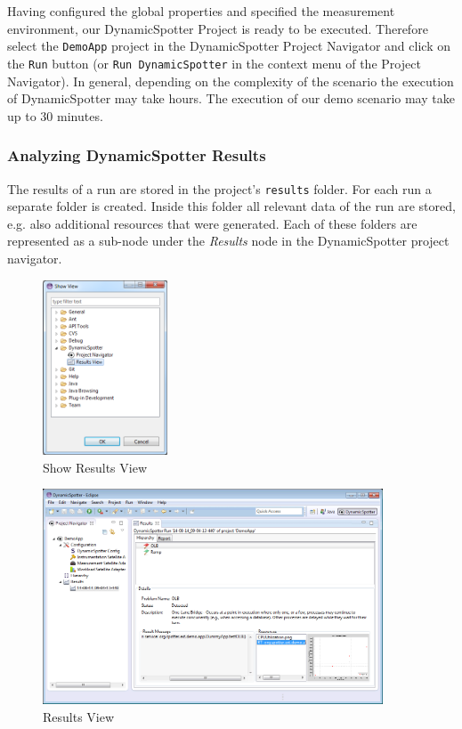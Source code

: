 \documentclass{report}
\newcommand{\DS}{DynamicSpotter }
\begin{document}
Having configured the global properties and specified the measurement environment, our \DS Project is ready to be
executed. Therefore select the \texttt{DemoApp} project in the \DS Project Navigator and click on the \texttt{Run}
button (or \texttt{Run DynamicSpotter} in the context menu of the Project Navigator).
In general, depending on the complexity of the scenario the execution of \DS may take hours. The execution of our demo
scenario may take up to 30 minutes. 

\subsubsection{Analyzing \DS Results}
The results of a run are stored in the project's \texttt{results} folder. For each run a separate folder is created.
Inside this folder all relevant data of the run are stored, e.g. also additional resources that were generated.
Each of these folders are represented as a sub-node under the \emph{Results} node in the \DS project navigator. 
\begin{figure}[h!] \centering \includegraphics[width=0.33\textwidth]{figures/demo/0014-results-1.png}
\caption{Show Results View}
\label{fig:openResultsView}
\end{figure}
\begin{figure}[h!] \centering \includegraphics[width=0.9\textwidth]{figures/demo/0014-results-2.png}
\caption{Results View}
\label{fig:resultsView}
\end{figure}
\end{document}
